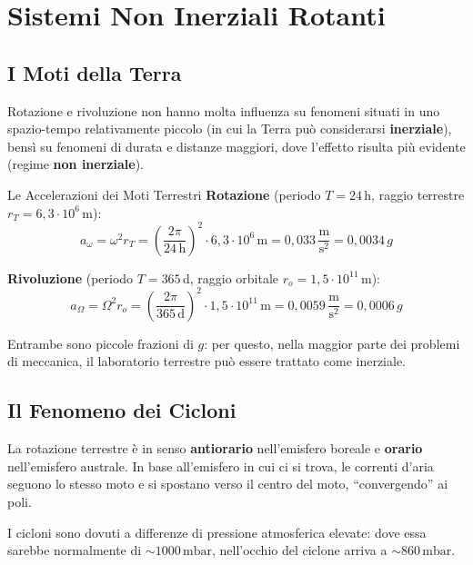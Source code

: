 \section{Sistemi Non Inerziali Rotanti}

\subsection{I Moti della Terra}

Rotazione e rivoluzione non hanno molta influenza su fenomeni situati in uno spazio-tempo relativamente piccolo (in cui la Terra può considerarsi \textbf{inerziale}), bensì su fenomeni di durata e distanze maggiori, dove l'effetto risulta più evidente (regime \textbf{non inerziale}).

\begin{esempio}{Le Accelerazioni dei Moti Terrestri}
\textbf{Rotazione} (periodo $T = 24\,\mathrm{h}$, raggio terrestre $r_T = 6{,}3 \cdot 10^6\,\mathrm{m}$):
\begin{equation}
    a_{\omega} = \omega^2 r_T = \left(\frac{2\pi}{24\,\mathrm{h}}\right)^{\!2} \cdot 6{,}3 \cdot 10^6\,\mathrm{m}
    = 0{,}033\,\frac{\mathrm{m}}{\mathrm{s}^2} = 0{,}0034\,g
\end{equation}

\textbf{Rivoluzione} (periodo $T = 365\,\mathrm{d}$, raggio orbitale $r_o = 1{,}5 \cdot 10^{11}\,\mathrm{m}$):
\begin{equation}
    a_{\Omega} = \Omega^2 r_o = \left(\frac{2\pi}{365\,\mathrm{d}}\right)^{\!2} \cdot 1{,}5 \cdot 10^{11}\,\mathrm{m}
    = 0{,}0059\,\frac{\mathrm{m}}{\mathrm{s}^2} = 0{,}0006\,g
\end{equation}

Entrambe sono piccole frazioni di $g$: per questo, nella maggior parte dei problemi di meccanica, il laboratorio terrestre può essere trattato come inerziale.
\end{esempio}

\subsection{Il Fenomeno dei Cicloni}

La rotazione terrestre è in senso \textbf{antiorario} nell'emisfero boreale e \textbf{orario} nell'emisfero australe. In base all'emisfero in cui ci si trova, le correnti d'aria seguono lo stesso moto e si spostano verso il centro del moto, ``convergendo'' ai poli.

I cicloni sono dovuti a differenze di pressione atmosferica elevate: dove essa sarebbe normalmente di $\sim 1000\,\mathrm{mbar}$, nell'occhio del ciclone arriva a $\sim 860\,\mathrm{mbar}$.

